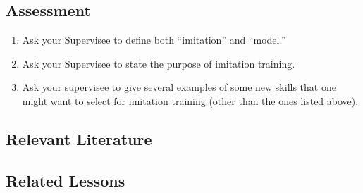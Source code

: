 \subsection{Assessment}
\begin{enumerate}
\item Ask your Supervisee to define both ``imitation'' and ``model.''
\item Ask your Supervisee to state the purpose of imitation training.
\item Ask your supervisee to give several examples of some new skills that one might want to select for imitation training (other than the ones listed above).
\end{enumerate}
%
\subsection{Relevant Literature}
\begin{refsection}
\nocite{baer1967development,
    cooper2007applied,
    striefel1974transfer}
\printbibliography[heading=none]
\end{refsection}
%
\subsection{Related Lessons}
\fourdFour{}\\
